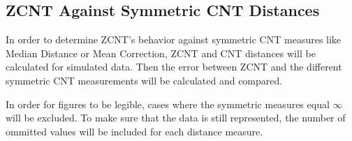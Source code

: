 \subsection{ZCNT Against Symmetric CNT Distances}\label{section:symmetric_cnt_vs_zcnt}
In order to determine ZCNT's behavior against symmetric CNT measures like Median Distance or Mean Correction, ZCNT and CNT distances will be calculated for simulated data. Then the error between ZCNT and the different symmetric CNT measurements will be calculated and compared. 

In order for figures to be legible, cases where the symmetric measures equal $\infty$ will be excluded. To make sure that the data is still represented, the number of ommitted values will be included for each distance measure.
